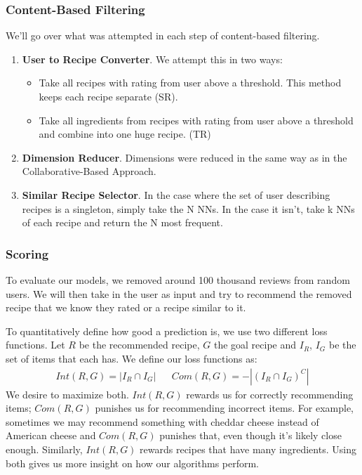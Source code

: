 \documentclass[11pt]{article}
\begin{document}
\subsubsection{Content-Based Filtering}
We'll go over what was attempted in each step of content-based filtering.
\begin{enumerate}
    \item \textbf{User to Recipe Converter}. We attempt this in two ways:
    \begin{itemize}
        \item Take all recipes with rating from user above a threshold. This method keeps each recipe separate (SR).
        \item Take all ingredients from recipes with rating from user above a threshold and combine into one huge recipe. (TR) 
    \end{itemize}
    \item \textbf{Dimension Reducer}. Dimensions were reduced in the same way as in the Collaborative-Based Approach.
    \item \textbf{Similar Recipe Selector}. In the case where the set of user describing recipes is a singleton, simply take the N NNs. In the case it isn't, take k NNs of each recipe and return the N most frequent.
\end{enumerate}

\subsubsection{Scoring}

To evaluate our models, we removed around 100 thousand reviews from random users. We will then take in the user as input and try to recommend the removed recipe that we know they rated or a recipe similar to it.

To quantitatively define how good a prediction is, we use two different loss functions.  Let $R$ be the recommended recipe, $G$ the goal recipe and $I_R$, $I_G$ be the set of items that each has. We define our loss functions as:
\begin{align}
    Int(R,G) = |I_R \cap I_G| && Com(R,G) = -|(I_R \cap I_G)^C|
\end{align}
We desire to maximize both. $Int(R,G)$ rewards us for correctly recommending items; $Com(R,G)$ punishes us for recommending incorrect items. For example, sometimes we may recommend something with cheddar cheese instead of American cheese and $Com(R,G)$ punishes that, even though it's likely close enough. Similarly, $Int(R,G)$ rewards recipes that have many ingredients. Using both gives us more insight on how our algorithms perform.
\end{document}
